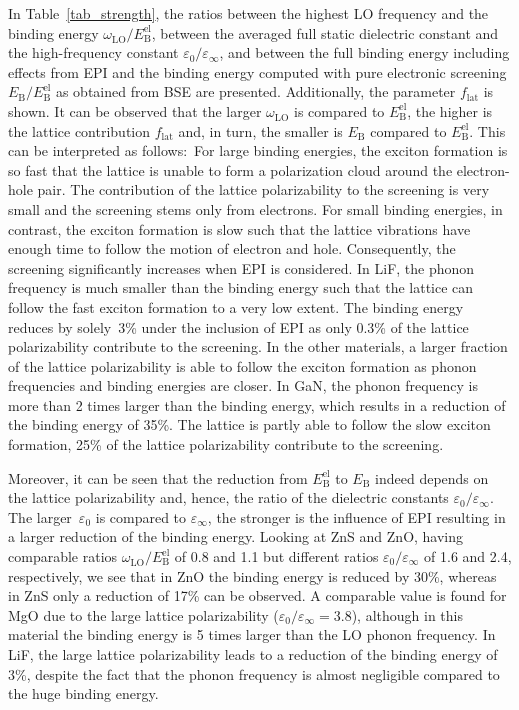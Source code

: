 In Table~\ref{tab_strength},  the ratios between the highest LO frequency and the binding energy $\omega^{\phantom{I}}_\text{LO}/E_\text{B}^{\text{el}}$,  between the averaged full static dielectric constant and the high-frequency constant $\varepsilon_0/\varepsilon_\infty$, and  between the full binding energy including effects from EPI and the binding energy computed with pure electronic screening $E_\text{B}^{\phantom{l}}/E_\text{B}^\text{el}$ as obtained from BSE are  presented. Additionally, the parameter $f_\text{lat}$ is shown. It can be observed that the larger  $\omega^{\phantom{I}}_\text{LO}$ is compared to  $E_\text{B}^{\text{el}}$, the higher is the lattice contribution $f_\text{lat}$ and, in turn, the smaller is $E_\text{B}^{\phantom{l}}$ compared to $E^\text{el}_\text{B}$. This can be interpreted as follows:~For large binding energies, the exciton formation is so fast that the lattice is unable to form a polarization cloud around the electron-hole pair. The contribution of the lattice polarizability to the screening is very small and the screening stems only from electrons. For small binding energies, in contrast, the exciton formation is slow such that the lattice vibrations have enough time to follow the motion of electron and hole. Consequently, the screening significantly increases when EPI is considered. In LiF, the phonon frequency is much smaller than the binding energy such that  the lattice can follow the fast exciton formation to a very low extent. The binding energy reduces by solely~3\% under the inclusion of EPI as only 0.3\% of the lattice polarizability contribute to the screening.  In the other materials, a larger fraction of the lattice polarizability is able to follow the exciton formation as phonon frequencies and binding energies are closer. In GaN, the phonon frequency is more than 2 times larger than the binding energy, which results in a reduction of the binding energy of 35\%. The  lattice is partly able to follow the slow exciton formation, 25\% of the lattice polarizability contribute to the screening.\par 

Moreover, it can be seen that the reduction from $E^\text{el}_\text{B}$ to  $E_\text{B}^{\phantom{l}}$ indeed depends on the lattice polarizability and, hence, the ratio of the dielectric constants $\varepsilon_0/\varepsilon_\infty$. The larger~$\varepsilon_0$ is compared to $\varepsilon_\infty$, the stronger is the influence of EPI resulting in a larger reduction of the binding energy. Looking at ZnS and ZnO, having comparable ratios $\omega^{\phantom{I}}_\text{LO}/E^\text{el}_\text{B}$ of 0.8 and 1.1 but different ratios $\varepsilon_0/\varepsilon_\infty$ of 1.6 and 2.4, respectively, we see that in ZnO  the binding energy is reduced by 30\%, whereas in ZnS only a reduction of 17\% can be observed. A comparable value is found for MgO due to the large lattice polarizability ($\varepsilon_0/\varepsilon_\infty=3.8$), although in this material the binding energy is 5 times larger than the LO phonon frequency. In LiF, the large lattice polarizability leads to a reduction of the binding energy of 3\%, despite the fact that the phonon frequency is almost negligible compared to the huge binding energy.\par

